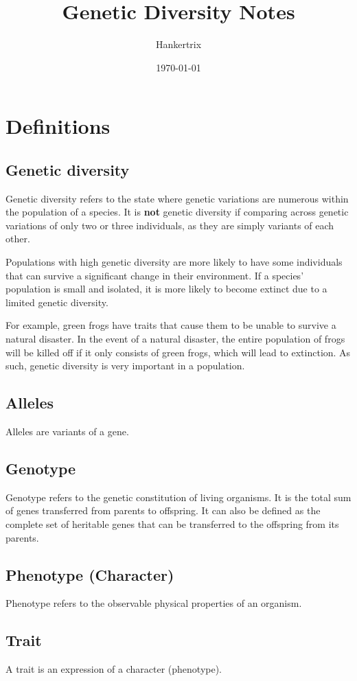 \documentclass[11pt]{article}
\author{Hankertrix}
\date{\today}
\title{Genetic Diversity Notes}
\begin{document}
\maketitle
\setcounter{tocdepth}{2}
\tableofcontents \clearpage\newpage
\section{Definitions}
\label{sec:org503d9a4}

\subsection{Genetic diversity}
\label{sec:orgf0db15a}
Genetic diversity refers to the state where genetic variations are numerous within the population of a species. It is \textbf{not} genetic diversity if comparing across genetic variations of only two or three individuals, as they are simply variants of each other.


Populations with high genetic diversity are more likely to have some individuals that can survive a significant change in their environment. If a species' population is small and isolated, it is more likely to become extinct due to a limited genetic diversity.


For example, green frogs have traits that cause them to be unable to survive a natural disaster. In the event of a natural disaster, the entire population of frogs will be killed off if it only consists of green frogs, which will lead to extinction. As such, genetic diversity is very important in a population.
\subsection{Alleles}
\label{sec:orga472058}
Alleles are variants of a gene.
\subsection{Genotype}
\label{sec:org0a812b8}
Genotype refers to the genetic constitution of living organisms. It is the total sum of genes transferred from parents to offspring. It can also be defined as the complete set of heritable genes that can be transferred to the offspring from its parents.
\subsection{Phenotype (Character)}
\label{sec:orge0982d9}
Phenotype refers to the observable physical properties of an organism.
\subsection{Trait}
\label{sec:org038d6ad}
A trait is an expression of a character (phenotype).
\end{document}

